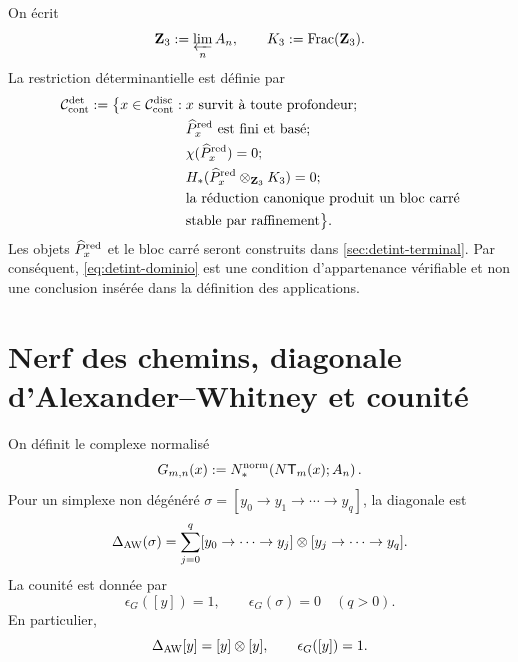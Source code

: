 On écrit
\begin{equation}\label{eq:detint-z3-k3}
 \mathbf Z_3:=\varprojlim_n A_n,
 \qquad
 K_3:=\operatorname{Frac}(\mathbf Z_3).
\end{equation}
La restriction déterminantielle est définie par
\begin{equation}\label{eq:detint-dominio}
\begin{split}
 \mathcal C_{\rm cont}^{\rm det}:=
 \bigl\{x\in\mathcal C_{\rm cont}^{\rm disc}:{}&
 x\text{ survit à toute profondeur};\\
 &\widehat P_x^{\rm red}\text{ est fini et basé};\\
 &\chi(\widehat P_x^{\rm red})=0;\\
 &H_*(\widehat P_x^{\rm red}\otimes_{\mathbf Z_3}K_3)=0;\\
 &\text{la réduction canonique produit un bloc carré}\\
 &\text{stable par raffinement}\bigr\}.
\end{split}
\end{equation}
Les objets \(\widehat P_x^{\rm red}\) et le bloc carré seront construits
dans \cref{sec:detint-terminal}. Par conséquent,
\eqref{eq:detint-dominio} est une condition d'appartenance vérifiable et non
une conclusion insérée dans la définition des applications.

\fi
\section{Nerf des chemins, diagonale d'Alexander--Whitney et counité}

On définit le complexe normalisé
\begin{equation}\label{eq:detint-gmn}
 G_{m,n}(x):=
 N_*^{\rm norm}\!\left(N\mathsf T_m(x);A_n\right).
\end{equation}
Pour un simplexe non dégénéré
\(\sigma=[y_0\to y_1\to\cdots\to y_q]\), la diagonale est
\begin{equation}\label{eq:detint-aw}
 \Delta_{\rm AW}(\sigma)
 =\sum_{j=0}^q
 [y_0\to\cdots\to y_j]\otimes
 [y_j\to\cdots\to y_q].
\end{equation}
La counité est donnée par
\begin{equation}\label{eq:detint-counidad-g}
 \epsilon_G([y])=1,
 \qquad
 \epsilon_G(\sigma)=0\quad(q>0).
\end{equation}
En particulier,
\begin{equation}\label{eq:detint-vertice-grouplike}
 \Delta_{\rm AW}[y]=[y]\otimes[y],
 \qquad
 \epsilon_G([y])=1.
\end{equation}

